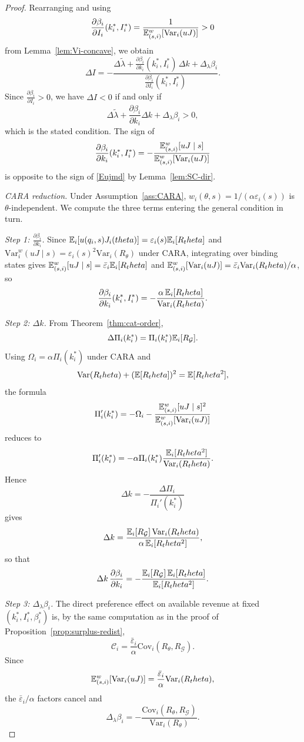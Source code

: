 \documentclass[master.tex]{subfiles}
\begin{document}
\begin{proof}
Rearranging and using
\[
\frac{\partial\beta_i}{\partial I_i}(k_i^\ast,I_i^\ast)
=
\frac{1}{\mathbb{E}_{(s,i)}^w[\mathrm{Var}_i(uJ)]}>0
\]
from Lemma~\ref{lem:Vi-concave}, we obtain
\[
\Delta I
=
-\frac{
\Delta\tilde\lambda
+
\frac{\partial \beta_i}{\partial k_i}(k_i^\ast,I_i^\ast)\,\Delta k
+
\Delta_\lambda\beta_i
}{
\frac{\partial \beta_i}{\partial I_i}(k_i^\ast,I_i^\ast)
}.
\]
Since $\frac{\partial\beta_i}{\partial I_i}>0$, we have $\Delta I<0$ if and only if
\[
\Delta\tilde\lambda
+
\frac{\partial\beta_i}{\partial k_i}\Delta k
+
\Delta_\lambda\beta_i
>0,
\]
which is the stated condition. The sign of
\[
\frac{\partial\beta_i}{\partial k_i}(k_i^\ast,I_i^\ast)
=
-\frac{\mathbb{E}_{(s,i)}^w[uJ\mid s]}{\mathbb{E}_{(s,i)}^w[\mathrm{Var}_i(uJ)]}
\]
is opposite to the sign of \eqref{Eujmd} by Lemma~\ref{lem:SC-dir}.

\noindent\textit{CARA reduction.} Under Assumption~\ref{ass:CARA}, $w_i(\theta,s)=1/(\alpha\varepsilon_i(s))$ is $\theta$-independent. We compute the three terms entering the general condition in turn.

\noindent\textit{Step 1: $\frac{\partial\beta_i}{\partial k_i}$.} Since $\mathbb{E}_i[u(q_i,s)J_i(theta)]=\varepsilon_i(s)\mathbb{E}_i[R_theta]$ and $\mathrm{Var}_i^w(uJ\mid s)=\varepsilon_i(s)^2\mathrm{Var}_i(R_\theta)$ under CARA, integrating over binding states gives $\mathbb{E}_{(s,i)}^w[uJ\mid s]=\bar\varepsilon_i\mathbb{E}_i[R_theta]$ and $\mathbb{E}_{(s,i)}^w[\mathrm{Var}_i(uJ)]=\bar\varepsilon_i\mathrm{Var}_i(R_theta)/\alpha$, so
\[
\frac{\partial\beta_i}{\partial k_i}(k_i^\ast,I_i^\ast)
=
-\frac{\alpha\,\mathbb{E}_i[R_theta]}{\mathrm{Var}_i(R_theta)}.
\]

\noindent\textit{Step 2: $\Delta k$.} From Theorem~\ref{thm:cat-order},
\[
\Delta\Pi_i(k_i^\ast)=\Pi_i(k_i^\ast)\mathbb{E}_i[R_\mathcal{G}].
\]
Using $\Omega_i=\alpha\Pi_i(k_i^\ast)$ under CARA and
\[
\mathrm{Var}(R_theta)+(\mathbb{E}[R_theta])^2=\mathbb{E}[R_theta^2],
\]
the formula
\[
\Pi_i'(k_i^\ast)
=
-\Omega_i-\frac{\mathbb{E}_{(s,i)}^w[uJ\mid s]^2}{\mathbb{E}_{(s,i)}^w[\mathrm{Var}_i(uJ)]}
\]
reduces to
\[
\Pi_i'(k_i^\ast)
=
-\alpha\Pi_i(k_i^\ast)\frac{\mathbb{E}_i[R_theta^2]}{\mathrm{Var}_i(R_theta)}.
\]
Hence
\[
\Delta k = -\frac{\Delta\Pi_i}{\Pi_i'(k_i^\ast)}
\]
gives
\[
\Delta k
=
\frac{\mathbb{E}_i[R_\mathcal{G}]\,\mathrm{Var}_i(R_theta)}{\alpha\,\mathbb{E}_i[R_theta^2]},
\]
so that
\[
\Delta k\,\frac{\partial\beta_i}{\partial k_i}
=
-\frac{\mathbb{E}_i[R_\mathcal{G}]\,\mathbb{E}_i[R_theta]}{\mathbb{E}_i[R_theta^2]}.
\]

\noindent\textit{Step 3: $\Delta_\lambda\beta_i$.} The direct preference effect on available revenue at fixed $(k_i^\ast,I_i^\ast,\beta_i^\ast)$ is, by the same computation as in the proof of Proposition~\ref{prop:surplus-redist},
\[
\mathcal C_i
=
\frac{\bar\varepsilon_i}{\alpha}\mathrm{Cov}_i(R_\theta,R_\mathcal{G}).
\]
Since
\[
\mathbb{E}_{(s,i)}^w[\mathrm{Var}_i(uJ)]
=
\frac{\bar\varepsilon_i}{\alpha}\mathrm{Var}_i(R_theta),
\]
the $\bar\varepsilon_i/\alpha$ factors cancel and
\[
\Delta_\lambda\beta_i
=
-\frac{\mathrm{Cov}_i(R_\theta,R_\mathcal{G})}{\mathrm{Var}_i(R_\theta)}.
\]


\end{proof}
\end{document}
